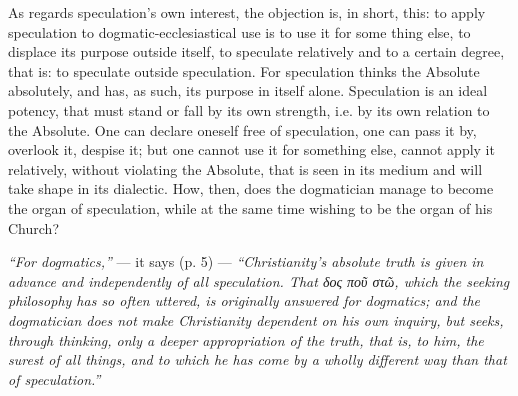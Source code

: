 \documentclass[12pt]{book}
\begin{document}
As regards speculation's own interest, the objection is, in short, this: to apply speculation to dogmatic-ecclesiastical use is to use it for some\-%
thing else, to displace its purpose outside itself, to speculate relatively and to a certain degree, that is: to speculate outside speculation. For speculation thinks the Absolute absolutely, and has, as such, its purpose in itself alone. Speculation is an ideal potency, that must stand or fall by its own strength, i.e. by its own relation to the Absolute. One can declare oneself free of speculation, one can pass it by, overlook it, despise it; but one cannot use it for something else, cannot apply it relatively, without violating the Absolute, that is seen in its medium and will take shape in its dialectic. How, then, does the dogmatician manage to become the organ of speculation, while at the same time wishing to be the organ of his Church?

\emph{``For dogmatics,''} --- it says (p. 5) --- \emph{``Christianity's absolute truth is given in advance and independently of all speculation. That \textit{δος} ποῦ στῶ, which the seeking philosophy has so often uttered, is originally answered for dogmatics; and the dogmatician does not make Christianity dependent on his own inquiry, but seeks, through thinking, only a deeper appropriation of the truth, that is, to him, the surest of all things, and to which he has come by a wholly different way than that of speculation.''}
\end{document}
